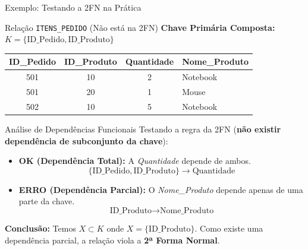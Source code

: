 \documentclass[9pt]{beamer}
\begin{document}
\begin{frame}{Exemplo: Testando a 2FN na Prática}
\small

\begin{block}{Relação \texttt{ITENS\_PEDIDO} (Não está na 2FN)}
\textbf{Chave Primária Composta:} $K = \{\text{ID\_Pedido}, \text{ID\_Produto}\}$

\vspace{0.2cm}
\centering
\begin{tabular}{|c|c|c|l|}
\hline
\textbf{ID\_Pedido} & \textbf{ID\_Produto} & \textbf{Quantidade} & \textbf{Nome\_Produto} \\
\hline
501 & 10 & 2 & Notebook \\
501 & 20 & 1 & Mouse \\
502 & 10 & 5 & Notebook \\
\hline
\end{tabular}
\end{block}

\vspace{0.3cm}

\begin{alertblock}{Análise de Dependências Funcionais}
Testando a regra da 2FN (\textbf{não existir dependência de subconjunto da chave}):
\begin{itemize}
    \item \textbf{OK (Dependência Total):} A \textit{Quantidade} depende de ambos.
    \[ \{\text{ID\_Pedido}, \text{ID\_Produto}\} \rightarrow \text{Quantidade} \]
    
    \item \textbf{ERRO (Dependência Parcial):} O \textit{Nome\_Produto} depende apenas de uma parte da chave.
    \[ \text{ID\_Produto} \rightarrow \text{Nome\_Produto} \]
\end{itemize}
\end{alertblock}

\vspace{0.1cm}

\textbf{Conclusão:} Temos $X \subset K$ onde $X = \{\text{ID\_Produto}\}$. Como existe uma dependência parcial, a relação viola a \textbf{2ª Forma Normal}.

\end{frame}
\end{document}
